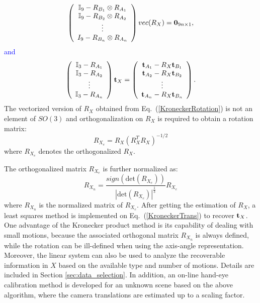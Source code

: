 \documentclass[twocolumn,10pt]{asme2ej}
\newcommand{\ttt}{{\bf t}}
\begin{document}
\begin{equation}
\left(
\begin{array}{c}
\mathbb{I}_{9} - R_{B_{1}} \otimes R_{A_{1}}\\
\mathbb{I}_{9} - R_{B_{2}} \otimes R_{A_{2}}\\
\vdots\\
I_{9} - R_{B_{n}} \otimes R_{A_{n}}
\end{array}
\right) 
vec(R_{X})
 = {\bf{0}}_{9 n \times 1},
\label{KroneckerRotation}
\end{equation}
\textcolor{blue}{and}
\begin{equation}
\left(
\begin{array}{c}
\mathbb{I}_{3} - R_{A_{1}} \\
\mathbb{I}_{3} - R_{A_{2}} \\
\vdots\\
\mathbb{I}_{3} - R_{A_{n}}
\end{array}
\right) 
{\ttt_{X}}
 = 
\left( 
\begin{array}{c}
{\bf{t}}_{A_{1}} - R_{X}{\bf{t}}_{B_{1}}\\
{\bf{t}}_{A_{2}} - R_{X}{\bf{t}}_{B_{2}}\\
\vdots\\
{\bf{t}}_{A_{n}} - R_{X}{\bf{t}}_{B_{n}}\\
\end{array}
\right).
\label{KroneckerTrans}
\end{equation}
The vectorized version of $R_X$ obtained from Eq.~(\ref{KroneckerRotation}) is not an element of $SO(3)$ and
orthogonalization on $R_{X}$ is required to obtain a rotation matrix:%
\begin{equation}
R_{X_{e}} = R_{X}(R_{X}^{T}R_{X})^{-1/2}
\label{Orthogonolization}
\end{equation}
\cite{horn1986robot}
where $R_{X_{e}}$ denotes the orthogonalized $R_{X}$.

The orthogonalized matrix $R_{X_{e}}$ is further normalized as: %
\begin{equation}
R_{X_{n}} = \dfrac{sign(\textrm{det}(R_{X_{e}}))}{{|\textrm{det}(R_{X_{e}})|}^{\tfrac{1}{3}}}R_{X_{e}}
\label{kron_normal}
\end{equation}
where $R_{X_{n}}$ is the normalized matrix of $R_{X_{e}}$.
After getting the estimation of $R_{X}$, a least squares method is implemented on Eq.~(\ref{KroneckerTrans}) to recover $\ttt_{X}$. One advantage of the Kronecker product method is its capability of dealing with small motions, because the associated orthogonal matrix $R_{X_{n}}$ is always defined, while the rotation can be ill-defined when using the axis-angle representation. Moreover, the linear system can also be used to analyze %
 the  recoverable information in $X$ based on the available type and number of motions. Details are included in Section \textcolor{blue}{\ref{sec:data_selection}}. In addition, an on-line hand-eye calibration method is developed for an unknown scene based on the above algorithm, where the camera translations are estimated up to a scaling factor. 
\end{document}
